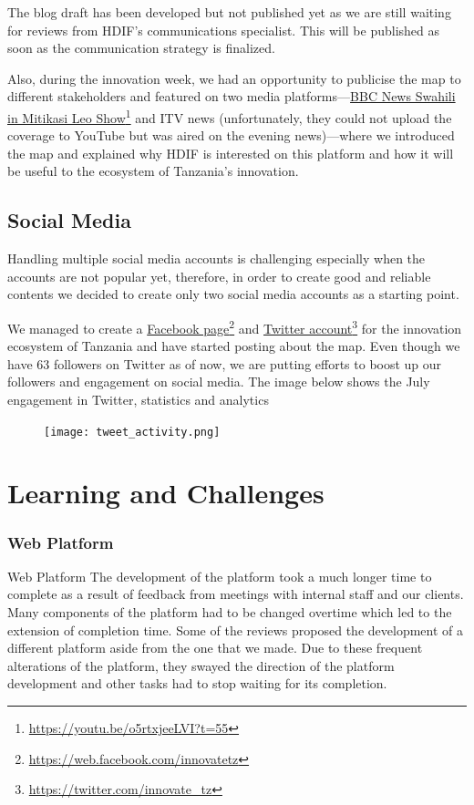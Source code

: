 \documentclass[a4paper,12pt,twoside]{article}
\begin{document}
The blog draft has been developed but not published yet as we are still waiting for reviews from HDIF's communications specialist. This will be published as soon as the communication strategy is finalized.

Also, during the innovation week, we had an opportunity to publicise the map to different stakeholders and featured on two media platforms---\href{https://youtu.be/o5rtxjeeLVI?t=55}{BBC News Swahili in Mitikasi Leo Show}\footnote{\url{https://youtu.be/o5rtxjeeLVI?t=55}} and ITV news (unfortunately, they could not upload the coverage to YouTube but was aired on the evening news)---where we introduced the map and explained why HDIF is interested on this platform and how it will be useful to the ecosystem of Tanzania's innovation.

\subsection{Social Media}
Handling multiple social media accounts is challenging especially when the accounts are not popular yet, therefore, in order to create good and reliable contents we decided to create only two social media accounts as a starting point.

We managed to create a \href{https://web.facebook.com/innovatetz}{Facebook page}\footnote{\url{https://web.facebook.com/innovatetz}} and \href{https://twitter.com/innovate_tz}{Twitter account}\footnote{\url{https://twitter.com/innovate_tz}} for the innovation ecosystem of Tanzania and have started posting about the map. Even though we have 63 followers on Twitter as of now, we are putting efforts to boost up our followers and engagement on social media. The image below shows the July engagement in Twitter, statistics and analytics 

\begin{figure}
    \centering
    \texttt{[image: tweet\_activity.png]}
\end{figure}

\section{Learning and Challenges}
\subsubsection{Web Platform}
Web Platform
The development of the platform took a much longer time to complete as a result of feedback from meetings with internal staff and our clients. Many components of the platform had to be changed overtime which led to the extension of completion time. Some of the reviews proposed the development of a different platform aside from the one that we made. Due to these frequent alterations of the platform, they swayed the direction of the platform development and other tasks had to stop waiting for its completion.
\end{document}
